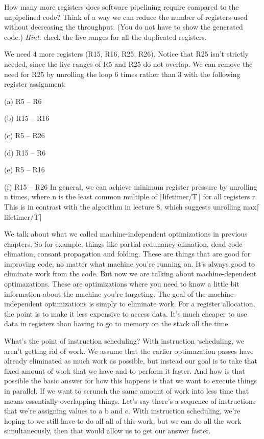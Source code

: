\begin{problem}
\begin{enumerate}
			\item How many more registers does software pipelining require compared to the unpipelined code? Think of a way we can reduce the number of registers used without decreasing the throughput. (You do not have to show the generated code.) \emph{Hint}: check the live ranges for all the duplicated registers.
		{\color{red}We need 4 more registers (R15, R16, R25, R26). Notice that R25 isn’t strictly needed,
		since the live ranges of R5 and R25 do not overlap. We can remove the need for R25
		by unrolling the loop 6 times rather than 3 with the following register assignment:
		\item (a) R5 – R6
		\item (b) R15 – R16
		\item (c) R5 – R26
		\item (d) R15 – R6
		\item (e) R5 – R16
		\item (f) R15 – R26
		In general, we can achieve minimum register pressure by unrolling n times, where n is
		the least common multiple of $\lceil$lifetimer/T$\rceil$ for all registers r. This is in contrast with
		the algorithm in lecture 8, which suggests unrolling max$\lceil$lifetimer/T$\rceil$}
		\end{enumerate}
		
		\end{problem}



We talk about what we called
machine-independent optimizations in previous chapters. So for example, things like
partial redunancy elimation, dead-code elimation, consant propagation and
folding. These are things that are good for improving code, no matter
what machine you're running on. It's always good to eliminate work
from the code. But now we are talking about machine-dependent optimazations.
These are optimizations where you need to know a little bit information
about the machine you're targeting. The goal of the machine-independent
optimizations is simply to eliminate work. For a register allocation, the point
is to make it less expensive to access data. It's much cheaper to use data in
registers than having to go to memory on the stack all the time.

What's the point of instruction scheduling? With instruction `scheduling,
we aren't getting rid of work. We assume that the earlier optimazation passes have
already eliminated as much work as possible, but instead our goal is to take that
fixed amount of work that we have and to perform it faster. And how is that possible
the basic answer for how this happens is that we want to execute things in parallel.
If we want to scrunch the same amount of work into less time that means essentially
overlapping things. Let's say there's a sequence of instructions that we're assigning
values to a b and c. With instruction scheduling, we're hoping to we still have to do all
all of this work, but we can do all the work simultaneously, then that would allow
us to get our answer faster.


